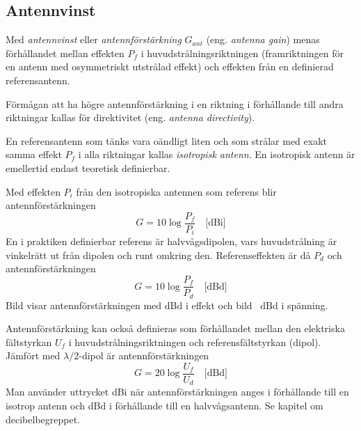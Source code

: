 \subsection{Antennvinst}
\label{antenner_antennvins}

Med \emph{antennvinst} eller \emph{antennförstärkning} \(G_{ant}\) (eng.
\emph{antenna gain}) menas förhållandet mellan effekten \(P_f\) i
huvudstrålningsriktningen (framriktningen för en antenn med osymmetriskt
utstrålad effekt) och effekten från en definierad referensantenn.

Förmågan att ha högre antennförstärkning i en riktning i förhållande till andra
riktningar kallas för direktivitet (eng. \emph{antenna directivity}).

En referensantenn som tänks vara oändligt liten och som strålar med exakt
samma effekt \(P_f\) i alla riktningar kallas \emph{isotropisk antenn}.
En isotropisk antenn är emellertid endast teoretisk definierbar.

Med effekten \(P_i\) från den isotropiska antennen som referens blir
antennförstärkningen
\[G = 10 \log\frac{P_f}{P_i} \quad \text{[dBi]}\]
En i praktiken definierbar referens är halvvågsdipolen, vars
huvudstrålning är vinkelrätt ut från dipolen och runt omkring den.
Referenseffekten är då \(P_d\) och antennförstärkningen
\[G = 10 \log\frac{P_f}{P_d} \quad \text{[dBd]}\] %
Bild  visar antennförstärkningen med dBd i effekt och
bild~ dBd i spänning.



Antennförstärkning kan också definieras som förhållandet mellan den elektriska
fältstyrkan \(U_f\) i huvudstrålningsriktningen och referensfältstyrkan (dipol).
Jämfört med \(\lambda/2\)-dipol är antennförstärkningen
\[G = 20 \log\frac{U_f}{U_d} \quad \text{[dBd]}\] %
Man använder uttrycket dBi när antennförstärkningen anges i förhållande till
en isotrop antenn och dBd i förhållande till en halvvågsantenn.
Se kapitel  om decibelbegreppet.


